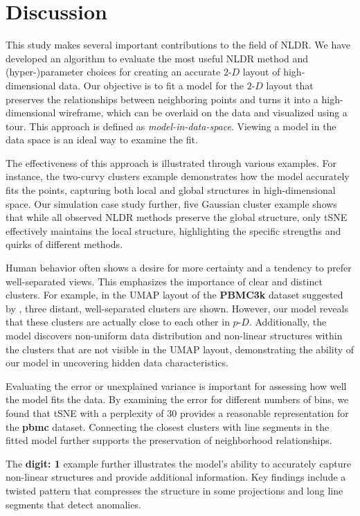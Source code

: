 \documentclass[
  12pt]{article}
\newcommand\pD{$p\text{-}D$}
\newcommand\gD{$2\text{-}D$}
\begin{document}
\section{Discussion}\label{sec-discussion}

This study makes several important contributions to the field of NLDR.
We have developed an algorithm to evaluate the most useful NLDR method
and (hyper-)parameter choices for creating an accurate \gD{} layout of
high-dimensional data. Our objective is to fit a model for the \gD{}
layout that preserves the relationships between neighboring points and
turns it into a high-dimensional wireframe, which can be overlaid on the
data and visualized using a tour. This approach is defined as
\emph{model-in-data-space}. Viewing a model in the data space is an
ideal way to examine the fit.

The effectiveness of this approach is illustrated through various
examples. For instance, the two-curvy clusters example demonstrates how
the model accurately fits the points, capturing both local and global
structures in high-dimensional space. Our simulation case study further,
five Gaussian cluster example shows that while all observed NLDR methods
preserve the global structure, only tSNE effectively maintains the local
structure, highlighting the specific strengths and quirks of different
methods.

Human behavior often shows a desire for more certainty and a tendency to
prefer well-separated views. This emphasizes the importance of clear and
distinct clusters. For example, in the UMAP layout of the
\textbf{PBMC3k} dataset suggested by \citet{chen2023}, three distant,
well-separated clusters are shown. However, our model reveals that these
clusters are actually close to each other in \pD{}. Additionally, the
model discovers non-uniform data distribution and non-linear structures
within the clusters that are not visible in the UMAP layout,
demonstrating the ability of our model in uncovering hidden data
characteristics.

Evaluating the error or unexplained variance is important for assessing
how well the model fits the data. By examining the error for different
numbers of bins, we found that tSNE with a perplexity of \(30\) provides
a reasonable representation for the \textbf{pbmc} dataset. Connecting
the closest clusters with line segments in the fitted model further
supports the preservation of neighborhood relationships.

The \textbf{digit: 1} example further illustrates the model's ability to
accurately capture non-linear structures and provide additional
information. Key findings include a twisted pattern that compresses the
structure in some projections and long line segments that detect
anomalies.
\end{document}
